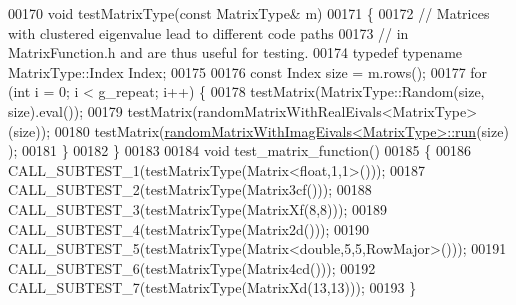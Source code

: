 \begin{DoxyCode}
00170 \textcolor{keywordtype}{void} testMatrixType(\textcolor{keyword}{const} MatrixType& m)
00171 \{
00172   \textcolor{comment}{// Matrices with clustered eigenvalue lead to different code paths}
00173   \textcolor{comment}{// in MatrixFunction.h and are thus useful for testing.}
00174   \textcolor{keyword}{typedef} \textcolor{keyword}{typename} MatrixType::Index Index;
00175 
00176   \textcolor{keyword}{const} Index size = m.rows();
00177   \textcolor{keywordflow}{for} (\textcolor{keywordtype}{int} i = 0; i < g\_repeat; i++) \{
00178     testMatrix(MatrixType::Random(size, size).eval());
00179     testMatrix(randomMatrixWithRealEivals<MatrixType>(size));
00180     testMatrix(\hyperlink{structrandom_matrix_with_imag_eivals}{randomMatrixWithImagEivals<MatrixType>::run}(size)
      );
00181   \}
00182 \}
00183 
00184 \textcolor{keywordtype}{void} test\_matrix\_function()
00185 \{
00186   CALL\_SUBTEST\_1(testMatrixType(Matrix<float,1,1>()));
00187   CALL\_SUBTEST\_2(testMatrixType(Matrix3cf()));
00188   CALL\_SUBTEST\_3(testMatrixType(MatrixXf(8,8)));
00189   CALL\_SUBTEST\_4(testMatrixType(Matrix2d()));
00190   CALL\_SUBTEST\_5(testMatrixType(Matrix<double,5,5,RowMajor>()));
00191   CALL\_SUBTEST\_6(testMatrixType(Matrix4cd()));
00192   CALL\_SUBTEST\_7(testMatrixType(MatrixXd(13,13)));
00193 \}
\end{DoxyCode}
